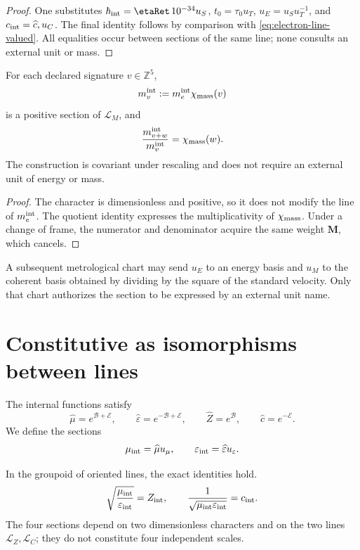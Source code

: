 \begin{proof}
One substitutes \(\hbar_{\rm int}=\etaRet\,10^{-34}u_S\), \(t_0=\tau_0u_T\), \(u_E=u_Su_T^{-1}\), and
\(c_{\rm int}=\widehat c,u_C\). The final identity follows by comparison with
\cref{eq:electron-line-valued}. All equalities occur between sections of the same line; none
consults an external unit or mass.
\end{proof}

\begin{proposition}
For each declared signature \(v\in\mathbb Z^5\),
\[
 m_v^{\rm int}:=m_e^{\rm int}\chi_{\rm mass}(v)
 \]
is a positive section of \(\mathcal L_M\), and
\[
 \frac{m_{v+w}^{\rm int}}{m_v^{\rm int}}
 =\chi_{\rm mass}(w).
\]
The construction is covariant under rescaling and does not require an external unit of energy or mass.
\end{proposition}

\begin{proof}
The character is dimensionless and positive, so it does not modify the line of
\(m_e^{\rm int}\). The quotient identity expresses the multiplicativity of
\(\chi_{\rm mass}\). Under a change of frame, the numerator and denominator
acquire the same weight \(\mathbf M\), which cancels.
\end{proof}

A subsequent metrological chart may send \(u_E\) to an energy basis
and \(u_M\) to the coherent basis obtained by dividing by the square
of the standard velocity. Only that chart authorizes the section to be
expressed by an external unit name.

\section{Constitutive as isomorphisms between lines}

The internal functions satisfy
\[
 \widehat\mu=e^{\mathcal B+\mathcal E},
 \qquad
 \widehat\varepsilon=e^{-\mathcal B+\mathcal E},
 \qquad
 \widehat Z=e^{\mathcal B},
 \qquad
 \widehat c=e^{-\mathcal E}.
\]
We define the sections
\[
 \mu_{\rm int}=\widehat\mu u_\mu,
 \qquad
 \varepsilon_{\rm int}=\widehat\varepsilon u_\varepsilon.
\]

\begin{theorem}
In the groupoid of oriented lines, the exact identities hold.
\[
 \sqrt{\frac{\mu_{\rm int}}{\varepsilon_{\rm int}}}
 =Z_{\rm int},
 \qquad
 \frac1{\sqrt{\mu_{\rm int}\varepsilon_{\rm int}}}
 =c_{\rm int}.
\]
The four sections depend on two dimensionless characters and on the two
lines \(\mathcal L_Z,\mathcal L_C\); they do not constitute four independent
scales.
\end{theorem}

